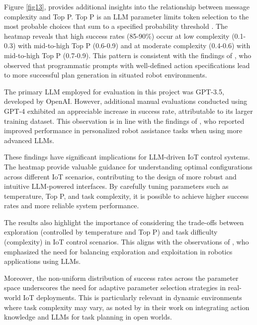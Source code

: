 \documentclass[lettersize,journal]{IEEEtran}
\begin{document}

Figure \ref{fig13}, provides additional insights into the relationship between message complexity and Top P. Top P is an LLM parameter limits token selection to the most probable choices that sum to a specified probability threshold \cite{rum2024setting}. The heatmap reveals that high success rates (85-90\%) occur at low complexity (0.1-0.3) with mid-to-high Top P (0.6-0.9) and at moderate complexity (0.4-0.6) with mid-to-high Top P (0.7-0.9). This pattern is consistent with the findings of \citet{Singh2023}, who observed that programmatic prompts with well-defined action specifications lead to more successful plan generation in situated robot environments.

The primary LLM employed for evaluation in this project was GPT-3.5, developed by OpenAI. However, additional manual evaluations conducted using GPT-4 exhibited an appreciable increase in success rate, attributable to its larger training dataset. This observation is in line with the findings of \citet{Wu2023}, who reported improved performance in personalized robot assistance tasks when using more advanced LLMs.

These findings have significant implications for LLM-driven IoT control systems. The heatmap provide valuable guidance for understanding optimal configurations across different IoT scenarios, contributing to the design of more robust and intuitive LLM-powered interfaces. By carefully tuning parameters such as temperature, Top P, and task complexity, it is possible to achieve higher success rates and more reliable system performance.

The results also highlight the importance of considering the trade-offs between exploration (controlled by temperature and Top P) and task difficulty (complexity) in IoT control scenarios. This aligns with the observations of \citet{10500490}, who emphasized the need for balancing exploration and exploitation in robotics applications using LLMs.

Moreover, the non-uniform distribution of success rates across the parameter space underscores the need for adaptive parameter selection strategies in real-world IoT deployments. This is particularly relevant in dynamic environments where task complexity may vary, as noted by \citet{Ding2023} in their work on integrating action knowledge and LLMs for task planning in open worlds.
\end{document}
